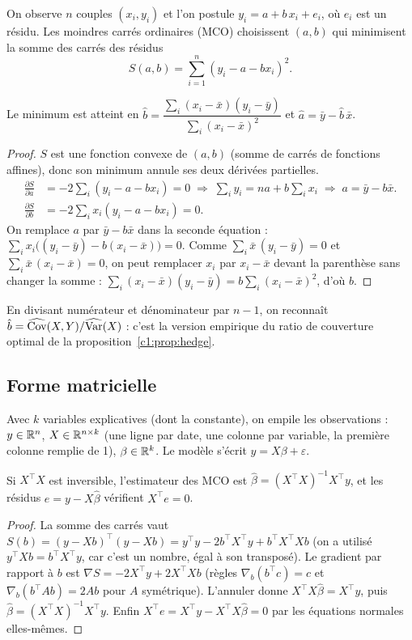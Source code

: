 On observe $n$ couples $(x_i, y_i)$ et l'on postule $y_i = a + b\,x_i + e_i$, où $e_i$ est un résidu. Les moindres carrés ordinaires (MCO) choisissent $(a,b)$ qui minimisent la somme des carrés des résidus
\[
S(a,b) = \sum_{i=1}^n (y_i - a - b x_i)^2.
\]

\begin{proposition}\label{c2:prop:ols1}
Le minimum est atteint en $\hat b = \dfrac{\sum_i (x_i-\bar x)(y_i-\bar y)}{\sum_i (x_i-\bar x)^2}$ et $\hat a = \bar y - \hat b\,\bar x$.
\end{proposition}
\begin{proof}
$S$ est une fonction convexe de $(a,b)$ (somme de carrés de fonctions affines), donc son minimum annule ses deux dérivées partielles.
\begin{align*}
\frac{\partial S}{\partial a} &= -2\sum_i (y_i - a - b x_i) = 0 \;\Rightarrow\; \sum_i y_i = n a + b\sum_i x_i \;\Rightarrow\; a = \bar y - b\bar x.\\
\frac{\partial S}{\partial b} &= -2\sum_i x_i(y_i - a - b x_i) = 0.
\end{align*}
On remplace $a$ par $\bar y - b\bar x$ dans la seconde équation : $\sum_i x_i\big((y_i-\bar y) - b(x_i-\bar x)\big) = 0$. Comme $\sum_i \bar x\,(y_i - \bar y) = 0$ et $\sum_i\bar x\,(x_i-\bar x) = 0$, on peut remplacer $x_i$ par $x_i - \bar x$ devant la parenthèse sans changer la somme : $\sum_i (x_i-\bar x)(y_i-\bar y) = b\sum_i(x_i-\bar x)^2$, d'où $\hat b$.
\end{proof}

En divisant numérateur et dénominateur par $n-1$, on reconnaît $\hat b = \widehat{\operatorname{Cov}}(X,Y)/\widehat{\operatorname{Var}}(X)$ : c'est la version empirique du ratio de couverture optimal de la proposition~\ref{c1:prop:hedge}.

\subsection{Forme matricielle}

Avec $k$ variables explicatives (dont la constante), on empile les observations : $y \in \mathbb{R}^n$, $X \in \mathbb{R}^{n\times k}$ (une ligne par date, une colonne par variable, la première colonne remplie de 1), $\beta \in \mathbb{R}^k$. Le modèle s'écrit $y = X\beta + \varepsilon$.

\begin{proposition}\label{c2:prop:olsmat}
Si $X^\top X$ est inversible, l'estimateur des MCO est $\hat\beta = (X^\top X)^{-1}X^\top y$, et les résidus $e = y - X\hat\beta$ vérifient $X^\top e = 0$.
\end{proposition}
\begin{proof}
La somme des carrés vaut $S(b) = (y-Xb)^\top(y-Xb) = y^\top y - 2b^\top X^\top y + b^\top X^\top X b$ (on a utilisé $y^\top Xb = b^\top X^\top y$, car c'est un nombre, égal à son transposé). Le gradient par rapport à $b$ est $\nabla S = -2X^\top y + 2X^\top X b$ (règles $\nabla_b(b^\top c) = c$ et $\nabla_b(b^\top Ab) = 2Ab$ pour $A$ symétrique). L'annuler donne $X^\top X\hat\beta = X^\top y$, puis $\hat\beta = (X^\top X)^{-1}X^\top y$. Enfin $X^\top e = X^\top y - X^\top X\hat\beta = 0$ par les équations normales elles-mêmes.
\end{proof}

